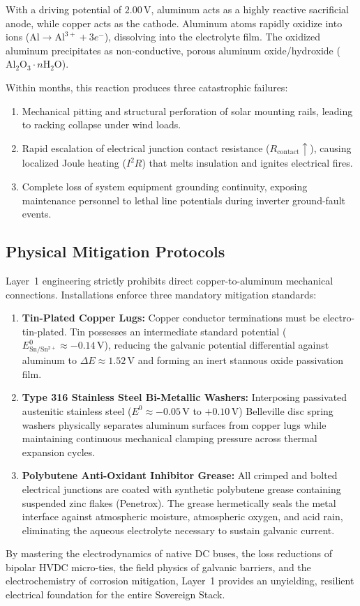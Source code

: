 With a driving potential of $2.00\,\mathrm{V}$, aluminum acts as a highly reactive sacrificial anode, while copper acts as the cathode. Aluminum atoms rapidly oxidize into ions ($\mathrm{Al} \to \mathrm{Al}^{3+} + 3e^-$), dissolving into the electrolyte film. The oxidized aluminum precipitates as non-conductive, porous aluminum oxide/hydroxide ($\mathrm{Al_2O_3} \cdot n\mathrm{H_2O}$). 

Within months, this reaction produces three catastrophic failures:
\begin{enumerate}
    \item Mechanical pitting and structural perforation of solar mounting rails, leading to racking collapse under wind loads.
    \item Rapid escalation of electrical junction contact resistance ($R_{\mathrm{contact}} \uparrow$), causing localized Joule heating ($I^2 R$) that melts insulation and ignites electrical fires.
    \item Complete loss of system equipment grounding continuity, exposing maintenance personnel to lethal line potentials during inverter ground-fault events.
\end{enumerate}

\subsection{Physical Mitigation Protocols}
Layer~1 engineering strictly prohibits direct copper-to-aluminum mechanical connections. Installations enforce three mandatory mitigation standards:
\begin{enumerate}
    \item \textbf{Tin-Plated Copper Lugs:} Copper conductor terminations must be electro-tin-plated. Tin possesses an intermediate standard potential ($E^0_{\mathrm{Sn/Sn^{2+}}} \approx -0.14\,\mathrm{V}$), reducing the galvanic potential differential against aluminum to $\Delta E \approx 1.52\,\mathrm{V}$ and forming an inert stannous oxide passivation film.
    \item \textbf{Type 316 Stainless Steel Bi-Metallic Washers:} Interposing passivated austenitic stainless steel ($E^0 \approx -0.05\,\mathrm{V}$ to $+0.10\,\mathrm{V}$) Belleville disc spring washers physically separates aluminum surfaces from copper lugs while maintaining continuous mechanical clamping pressure across thermal expansion cycles.
    \item \textbf{Polybutene Anti-Oxidant Inhibitor Grease:} All crimped and bolted electrical junctions are coated with synthetic polybutene grease containing suspended zinc flakes (Penetrox). The grease hermetically seals the metal interface against atmospheric moisture, atmospheric oxygen, and acid rain, eliminating the aqueous electrolyte necessary to sustain galvanic current.
\end{enumerate}

By mastering the electrodynamics of native DC buses, the loss reductions of bipolar HVDC micro-ties, the field physics of galvanic barriers, and the electrochemistry of corrosion mitigation, Layer~1 provides an unyielding, resilient electrical foundation for the entire Sovereign Stack.
